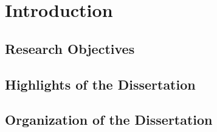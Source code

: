 \chapter[Introduction]{Introduction}\label{cap_intro}

\section{Research Objectives}

\section{Highlights of the Dissertation}

\section{Organization of the Dissertation}
